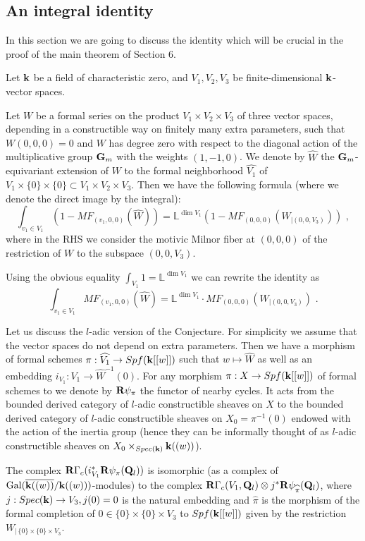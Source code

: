 \documentclass[12pt]{article}
\begin{document}
\subsection{An integral identity}

In this section we are going to discuss the identity which will be crucial in the proof of the main theorem of Section 6.

Let ${\bf k}$ be a field of characteristic zero, and $V_1,V_2,V_3$ be finite-dimensional ${\bf k}$-vector spaces.

\begin{conj} Let $W$ be a formal series on the product $V_1\times V_2\times V_3$ of three vector spaces,
depending in a constructible way on finitely many extra parameters, such that $W(0,0,0)=0$ and $W$ has degree zero
with respect to the diagonal action of the multiplicative group ${\bf G}_m$ with the
weights $(1,-1,0)$. We denote by $\widehat{W}$ the ${\bf G}_m$-equivariant extension of $W$
to the formal neighborhood $\widehat{V_1}$ of $V_1\times \{0\}\times \{0\}\subset V_1\times V_2\times V_3$.
Then we have the following formula (where we denote the direct image by the integral):
$$\int_{v_1\in V_1}(1-MF_{(v_1,0,0)}(\widehat{W}))={\mathbb L}^{\dim  V_1}(1-MF_{(0,0,0)}(W_{|(0,0,V_3)}))\,\,,$$
where in the RHS we consider the motivic Milnor fiber  at $(0,0,0)$ of the restriction of  $W$  to the subspace $(0,0,V_3)$.
\end{conj}


Using the obvious equality $\int_{V_1} 1={\mathbb L}^{\dim  V_1}$ we can rewrite the identity as 
$$\int_{v_1\in V_1}MF_{(v_1,0,0)}(\widehat{W})={\mathbb L}^{\dim  V_1}\cdot MF_{(0,0,0)}(W_{|(0,0,V_3)})\,\,.$$


Let us discuss the $l$-adic version of the Conjecture. For simplicity we assume that the vector spaces do not depend on extra parameters.
Then we have a morphism of formal schemes $\pi: \widehat{V_1}\to Spf({\bf k}[[w]])$ such that $w\mapsto \widehat{W}$ as well as an embedding $i_{V_1}:V_1\to \widehat{W}^{-1}(0)$. For any morphism 
$\pi: X\to Spf({\bf k}[[w]])$ of formal schemes to we denote by ${\bf R}\psi_{\pi}$ the functor of nearby cycles.  It acts from the bounded derived category of $l$-adic constructible sheaves on $X$ to the bounded derived category of $l$-adic constructible sheaves on $X_0=\pi^{-1}(0)$ endowed with the action of the inertia group (hence  they can be informally thought of as $l$-adic constructible sheaves on $X_0\times_{Spec({\bf k})}{\bf k}((w))$).

\begin{prp} The complex ${\bf R}\Gamma_c(i^{\ast}_{V_1}{\bf R}\psi_{\pi}({\bf Q}_l))$ is isomorphic
(as a complex of  $\operatorname{Gal}(\overline{{\bf k}((w))}/{\bf k}((w)))$-modules) to the complex
${\bf R}\Gamma_c(V_1,{\bf Q}_l)\otimes j^{\ast}{\bf R}\psi_{\widehat{\pi}}({\bf Q}_l)$, where $j:Spec({\bf k})\to V_3, j(0)=0$ is the natural embedding and $\widehat{\pi}$ is the morphism of the formal completion of $0\in \{0\}\times\{0\}\times V_3$ to $Spf({\bf k}[[w]])$ given by the restriction $W_{|\,\{0\}\times\{0\}\times V_3}$.

\end{prp}
\end{document}

